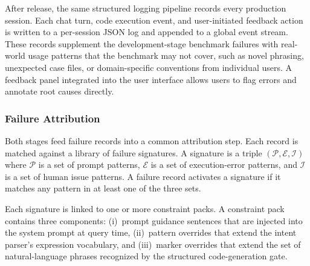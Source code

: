 \documentclass[journal]{IEEEtran}
\begin{document}
After release, the same structured logging pipeline records every
production session.
Each chat turn, code execution event, and user-initiated feedback action is written to a per-session JSON log and appended to a global event stream.
These records supplement the development-stage benchmark failures with real-world usage patterns that the benchmark may not cover, such as novel phrasing, unexpected case files, or domain-specific conventions from individual users.
A feedback panel integrated into the user interface allows users to flag errors and annotate root causes directly.

\subsubsection{Failure Attribution}

Both stages feed failure records into a common attribution step.
Each record is matched against a library of failure signatures.
A signature is a triple $(\mathcal{P}, \mathcal{E}, \mathcal{I})$ where $\mathcal{P}$ is a set of prompt patterns, $\mathcal{E}$ is a set of execution-error patterns, and $\mathcal{I}$ is a set of human issue patterns.
A failure record activates a signature if it matches any pattern in at least one of the three sets.

Each signature is linked to one or more constraint packs.
A constraint pack contains three components:
(i)~prompt guidance sentences that are injected into the system prompt at query time,
(ii)~pattern overrides that extend the intent parser's expression vocabulary,
and
(iii)~marker overrides that extend the set of natural-language phrases recognized by the structured code-generation gate.


\end{document}
